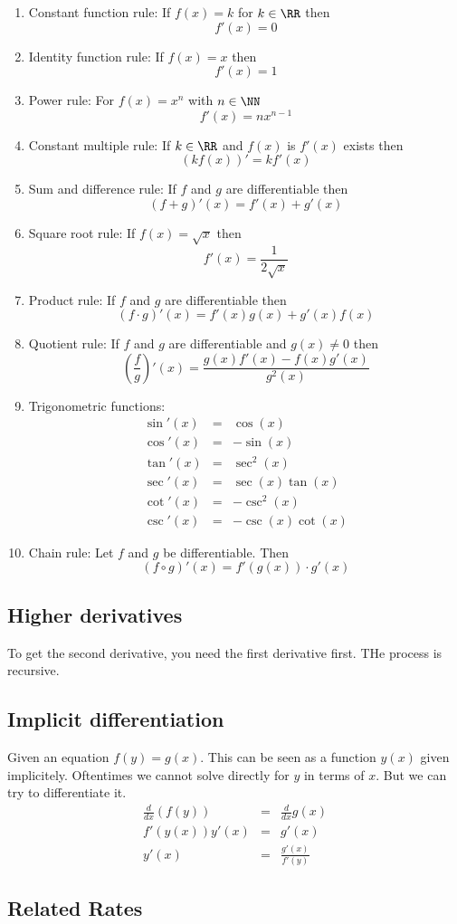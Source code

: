 \documentclass{article}
\theoremstyle{plain}
\theoremstyle{remark}
\theoremstyle{definition}
\begin{document}
\begin{enumerate} \item Constant function rule: If $f(x)=k$ for $k\in \RR$ then
$$f'(x)= 0$$
\item Identity function rule: If $f(x)=x$ then
$$f'(x)=1$$
\item Power rule: For $f(x)=x^n$ with $n\in\NN$
$$f'(x)=nx^{n-1}$$
\item Constant multiple rule: If $k\in\RR$ and $f(x)$ is $f'(x)$ exists then
$$\left(kf(x)\right)'=kf'(x)$$
\item Sum and difference rule: If $f$ and $g$ are differentiable then
$$(f+g)'(x) =f'(x)+g'(x)$$
\item Square root rule: If $f(x)=\sqrt{x}$ then
$$f'(x)=\frac{1}{2\sqrt{x}}$$
\item Product rule: If $f$ and $g$ are differentiable then
$$\left(f\cdot g\right)'(x)=f'(x)g(x)+g'(x)f(x)$$
\item Quotient rule: If $f$ and $g$ are differentiable and $g(x)\neq 0$ then
$$\left(\frac{f}{g}\right)'(x)=\frac{g(x)f'(x)-f(x)g'(x)}{g^2(x)}$$
\item Trigonometric functions:
\begin{eqnarray*}\sin'(x)&=&\cos(x)\\
\cos'(x) &=& -\sin(x)\\
\tan'(x) &=& \sec^2(x)\\
\sec'(x) &=& \sec(x)\tan(x)\\
\cot'(x) &=& -\csc^2(x)\\
\csc'(x) &=& -\csc(x)\cot(x)\end{eqnarray*}
\item Chain rule: Let $f$ and $g$ be differentiable. Then
$$(f\circ g)'(x)=f'(g(x))\cdot g'(x)$$
\end{enumerate}

\subsection*{Higher derivatives}

To get the second derivative, you need the first derivative first. THe process is recursive.

\subsection*{Implicit differentiation}

Given an equation $f(y)=g(x)$. This can be seen as a function $y(x)$ given implicitely. Oftentimes we cannot solve directly for $y$ in terms of $x$. But we can try to differentiate it.
\begin{eqnarray*}\frac{d}{dx}\left(f(y)\right) &=& \frac{d}{dx}g(x)\\
f'(y(x))y'(x) &=& g'(x)\\
y'(x) &=& \frac{g'(x)}{f'(y)}\end{eqnarray*}

\subsection*{Related Rates}
\end{document}
